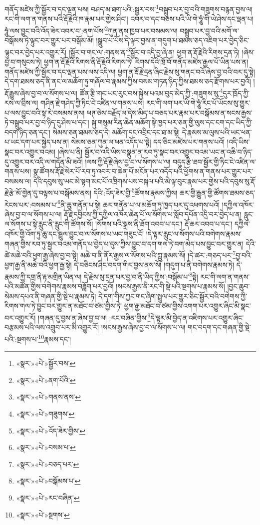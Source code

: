 གནོད་མཛེས་ཀྱི་སྦྱོར་བ་དང་ལྡན་པས། བཤད་མ་ཐག་པའི་:སྦྱར་བས་\footnote{«སྣར་»«པེ་»སྦྱོར་བས་}བསྒྲུབ་པར་བྱ་བའི་གཟུགས་བརྙན་བྱས་ལ། རང་གི་ལག་ན་གནས་པའི་རྡོ་རྗེའི་ཁ་རྣམ་པར་གྱེས་ཤིང་། འབར་བ་དང་བཅས་པའི་ཡི་གེ་ཧཱུཾ་གི་ཡེ་ཤེས་དང་ལྡན་པ། ཧཱུཾ་ལས་བྱུང་བའི་འོད་ཟེར་འབར་བ་:ནག་པོས་\footnote{«སྣར་»«པེ་»ནག་པོའི་}ཀུན་ནས་ཁྱབ་པར་བསམས་ལ། བསྒྲུབ་པར་བྱ་བའི་མགོ་ལ་བསྒོམས་ཏེ་ལྟུང་བར་གྱུར་པར་བསྒོམ་མོ། །སྒྲུབ་པ་པོས་དེ་ལྟར་བྱས་ན་གདུག་པ་ཐམས་ཅད་འཇིག་པར་བྱེད་ཅིང་ལྟུང་བར་བྱེད་པར་འགྱུར་རོ། །སྦྱོར་བ་གང་ལ་:གནས་ན་\footnote{«སྣར་»«པེ་»གནས་ནས་}སྦྱོར་བ་འདི་བྱ་ཞེ་ན། ཕྱག་ན་རྡོ་རྗེའི་རིགས་དྲན་ཏེ། །ཞེས་བྱ་བ་གསུངས་ཏེ། ཕྱག་ན་རྡོ་རྗེའི་རིགས་ནི་རྡོ་རྗེའི་རིགས་ཏེ། རིགས་དེའི་ཁྲོ་བོ་གནོད་མཛེས་རྒྱལ་པོ་ཡིན་པས་ན། གནོད་མཛེས་ཀྱི་སྦྱོར་བ་དང་ལྡན་པས་ལས་འདི་ལ། ཕྱག་ན་རྡོ་རྗེ་དྲན་ཞིང་རྗེས་སུ་གནང་བའོ་ཞེས་བྱ་བའི་བར་དུ་སྟེ། དེ་དག་ཐམས་ཅད་ནི་ནང་ལ་མཆོག་ཏུ་གཞོལ་བ་རྣམས་ཀྱིས་བསམ་གཏན་ཉིད་ཀྱིས་ཐམས་ཅད་རྫོགས་པར་བྱའོ། །རྡོ་རྒྱུས་ཞེས་བྱ་བ་ལ་སོགས་པ་ལ། ཚོན་རྩི་གང་ཡང་རུང་བས་སྐྱེས་པའམ་བུད་མེད་ཀྱི་:གཟུགས་སུ་\footnote{«སྣར་»«པེ་»གཟུགས་}དུར་ཁྲོད་ཀྱི་རས་ལ་བྲིས་ལ། གཤིན་རྗེ་གཤེད་ཀྱི་ཏིང་ངེ་འཛིན་ལ་གནས་པས། རང་གི་ལག་པར་ཡི་གེ་ཧཱུཾ་རིང་པོ་ཡོངས་སུ་གྱུར་པ་ལས་བྱུང་བའི་སྟ་རེ་བསམས་ནས། ཕཊ་ཅེས་བརྗོད་ལ་དེས་མིད་པ་བཅད་པར་རྣམ་པར་བསྒོམས་ན་སངས་རྒྱས་ཏེ་བསྒྲུབ་པར་བྱ་བ་ཉིད་དུ་ཤེས་པ་དང་། སྐུ་གསུམ་རིན་ཆེན་མཆོག་སྟེ་ཁྱད་པར་ཅན་གྱི་ལུས་དང་ངག་དང་ཡིད་ཀྱི་བདག་ཉིད་ཅན་དང་། སེམས་ཅན་ཐམས་ཅད་དེ། མཆོག་དང་འབྲིང་དང་ཐ་མ་སྟེ། དེ་རྣམས་མ་ལུས་པའི་ཡང་ཕན་པ་ཡང་དག་པར་སྐྱེད་པས་ན། སེམས་ཅན་ཀུན་ལ་ཕན་འདོད་པ་སྟེ། དད་ཅིང་མཛེས་པར་གནས་པའོ། །འདི་ཡིས་སྣང་བར་འགྱུར་བའམ། །ཞེས་པ་ནི། སྦྱོར་བ་འདི་ཡིས་བསྣུན་ན་རབ་ཏུ་སྣང་བར་འགྱུར་བའམ་ཡང་ན་འཆི་བ་ཉིད་དུ་འགྱུར་བར་འདི་ལ་གདོན་མི་ཟའོ། །ལས་ཀྱི་རྡོ་རྗེ་ཞེས་བྱ་བ་ལ་སོགས་པ་ལ། བདུད་རྩི་ཐབ་སྦྱོར་གྱི་ཏིང་ངེ་འཛིན་ལ་གནས་པས། སྣ་ཚོགས་རྡོ་རྗེ་སེར་པོ་རབ་ཏུ་འབར་བ་ཆེན་པོ་མངོན་པར་འདོད་པའི་ཕྱོགས་ན་གནས་པར་གྱུར་པར་བསམས་ལ། དེའི་དབུས་སུ་ཡང་མེ་སྟག་མང་པོ་འཁྲིགས་པས་བསྐལ་པའི་མེ་ལྟ་བུར་རྣམ་པར་གྱེས་པའི་དབུས་སུ་རྡོ་རྗེ་རྩེ་མོ་གྱེན་དུ་བལྟས་པ་བསྒོམས་ནས། དེའི་:འོད་ཟེར་གྱི་\footnote{«སྣར་»«པེ་»འོད་ཟེར་གྱིས་}ཚོགས་རྣམས་ཀྱིས། ཆར་གྱི་རྒྱུན་གྱི་ཚོགས་ཐམས་ཅད་རེངས་པར་:བསམས་པ་\footnote{«སྣར་»«པེ་»བསམ་པ་}ནི་ཆུ་གནོན་པ་སྟེ། ཆར་གནོན་པ་ལ་མཆོག་ཏུ་ཁྱད་པར་དུ་འཕགས་པའོ། །དཀྱིལ་འཁོར་ཞེས་བྱ་བ་ལ་སོགས་པ་ལ། རྡོ་རྗེ་དབྱིངས་ཀྱི་དཀྱིལ་འཁོར་ཆེན་པོ་ལ་སོགས་པ་སློབ་དཔོན་འདྲི་བར་བྱེད་པ་ན། རླུང་ལ་སོགས་པ་སྟེ་རླུང་ནི་རླུང་གི་ཚོགས་སོ། །སོགས་པའི་སྒྲས་ནི་ཐོག་འབབ་པ་དང་། རྡོ་ཆར་འབབ་པ་དང་། དཀྱིལ་འཁོར་གྱི་འོག་ཏུ་ཆུ་དང་སྦྲུལ་བྱུང་བ་ལ་སོགས་པ་ཡང་གཟུང་ངོ། །དེ་ལྟར་རླུང་ལ་སོགས་པའི་བགེགས་རྣམས་གཞན་གྱིས་རབ་ཏུ་སྦྱར་བའམ་གནོད་པ་བྱེད་པ་དུས་ཀྱིས་བྱུང་བ་དག་གལ་ཏེ་བག་མེད་པས་བྱུང་བར་གྱུར་ན། དེའི་ཚེ་མཆེ་བའི་ཕྱག་རྒྱ་ཞེས་བྱ་བ་སྟེ། མཆེ་བ་ནི་ནོར་རྒྱས་ལ་སོགས་པའི་ཀླུ་རྣམས་སོ། །དེ་ཚར་:གཅད་པར་\footnote{«སྣར་»«པེ་»བཅད་པར་}བྱ་བའི་ཕྱག་རྒྱ་ནི་མཆེ་བའི་ཕྱག་རྒྱ་སྟེ། དེ་བཅིངས་ཤིང་བདག་གིར་བྱས་ནས་སོ། །གདུག་པ་ནི་བགེགས་རྣམས་ཏེ། དེ་རྣམས་ཀྱི་དགྲ་ནི་རྟ་མགྲིན་ཡིན་ལ། དེ་རྗེས་སུ་དྲན་པར་བྱ་བ་ནི་ཡིད་ཀྱིས་:བསྒོམ་པ་\footnote{«སྣར་»«པེ་»བསྒོམས་པ་}སྟེ། རང་གི་ལག་ན་གནས་པའི་མཚོན་གྱིས་བགེགས་རྣམས་བཟློག་པར་བྱའོ། །སངས་རྒྱས་ནི་རང་གི་སྡེ་པའི་སྔགས་པ་རྣམས་སོ། །བྱང་ཆུབ་སེམས་དཔའ་ནི་གཞན་གྱི་སྡེ་པ་རྣམས་ཏེ། དེ་དག་གིས་ཀྱང་གང་ཞིག་སྤྲུལ་པར་གྱུར་ཅིང་སྦྱོར་བའི་བགེགས་ཀྱི་རིགས་གལ་ཏེ་བྱུང་བར་གྱུར་ན་མཐོང་བ་ཙམ་གྱིས་ཏེ། ཕྱག་རྒྱ་མཐོང་བ་ཙམ་གྱིས་འགག་པར་འགྱུར་ཞིང་མི་སྣང་བར་འགྱུར་རོ། །གཞན་དུ་བྱས་ན་ཞེས་བྱ་བ་ལ། :རང་བཞིན་གྱིས་\footnote{«སྣར་»«པེ་»རང་བཞིན་}དེ་ལྟར་མི་བྱེད་ན་འཇིགས་པར་འགྱུར་ཞིང་བརྩམས་པའི་ལས་འགྲུབ་པར་མི་འགྱུར་རོ། །སངས་རྒྱས་ཞེས་བྱ་བ་ལ་སོགས་པ་ལ། གང་བདག་དང་གཞན་གྱི་སྡེ་པའི་:སྔགས་པ་\footnote{«སྣར་»«པེ་»སྔགས་}རྣམས་དང་། 